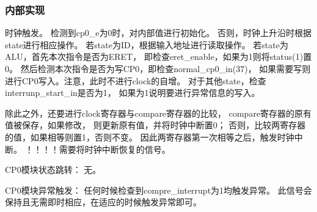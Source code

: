         \subsubsection{内部实现}
            时钟触发。%
            检测到cp0\_e为0时，对内部值进行初始化。%
            否则，时钟上升沿时根据state进行相应操作。%
            若state为ID，根据输入地址进行读取操作。%
            若state为ALU，首先本次指令是否为ERET，%
            即检查eret\_enable，如果为1则将status(1)置0。%
            然后检测本次指令是否为写CP0，即检查normal\_cp0\_in(37)，%
            如果需要写则进行CP0写入。注意，此时不进行clock的自增。%
            对于其他state，检查interrunp\_start\_in是否为1，%
            如果为1说明要进行异常信息的写入。%
            
            除此之外，还要进行clock寄存器与compare寄存器的比较，%
            compare寄存器的原有值被保存，如果修改，%
            则更新原有值，并将时钟中断置0；%
            否则，比较两寄存器的值，如果相等则置1，否则不变。%
            因此两寄存器第一次相等之后，触发时钟中断。%
            ！！！！需要将时钟中断恢复的信号。

            CP0模块状态跳转：%
            无。%

            CP0模块异常触发：%
            任何时候检查到compre\_interrupt为1均触发异常。%
            此信号会保持且无需即时相应，在适应的时候触发异常即可。

